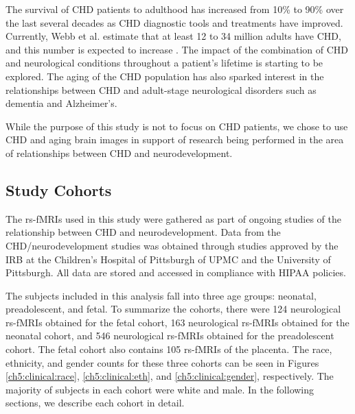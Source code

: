 The survival of CHD patients to adulthood has increased from 10\% to 90\% over the last several decades as CHD diagnostic tools and treatments have improved.  Currently, Webb et al. estimate that at least 12 to 34 million adults have CHD, and this number is expected to increase \cite{Webb2015}. The impact of the combination of CHD and neurological conditions throughout a patient's lifetime is starting to be explored. The aging of the CHD population has also sparked interest in the relationships between CHD and adult-stage neurological disorders such as dementia and Alzheimer's. 

While the purpose of this study is not to focus on CHD patients, we chose to use CHD and aging brain images in support of research being performed in the area of relationships between CHD and neurodevelopment.

\subsection{Study Cohorts}

The rs-fMRIs used in this study were gathered as part of ongoing studies of the relationship between CHD and neurodevelopment. Data from the CHD/neurodevelopment studies was obtained through studies approved by the IRB at the Children's Hospital of Pittsburgh of UPMC and the University of Pittsburgh. All data are stored and accessed in compliance with HIPAA policies.

The subjects included in this analysis fall into three age groups: neonatal, preadolescent, and fetal. To summarize the cohorts, there were 124 neurological rs-fMRIs obtained for the fetal cohort, 163 neurological rs-fMRIs obtained for the neonatal cohort, and 546 neurological rs-fMRIs obtained for the preadolescent cohort. The fetal cohort also contains 105 rs-fMRIs of the placenta. The race, ethnicity, and gender counts for these three cohorts can be seen in Figures \ref{ch5:clinical:race}, \ref{ch5:clinical:eth}, and \ref{ch5:clinical:gender}, respectively. The majority of subjects in each cohort were white and male. In the following sections, we describe each cohort in detail. 

